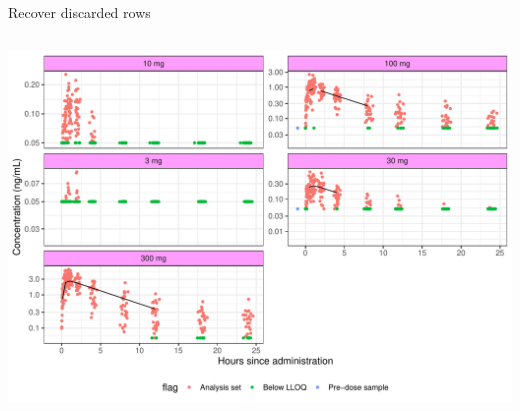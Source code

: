 \documentclass[
  8pt,
  ignorenonframetext,
  aspectratio=169]{beamer}
\begin{document}
\begin{frame}[fragile]{Recover discarded rows}
\begin{columns}[T]
\begin{column}{0.55\textwidth}
\begin{center}\includegraphics[width=1.05\linewidth]{plots/unnamed-chunk-34-1} \end{center}
\end{column}
\end{columns}
\end{frame}
\end{document}
